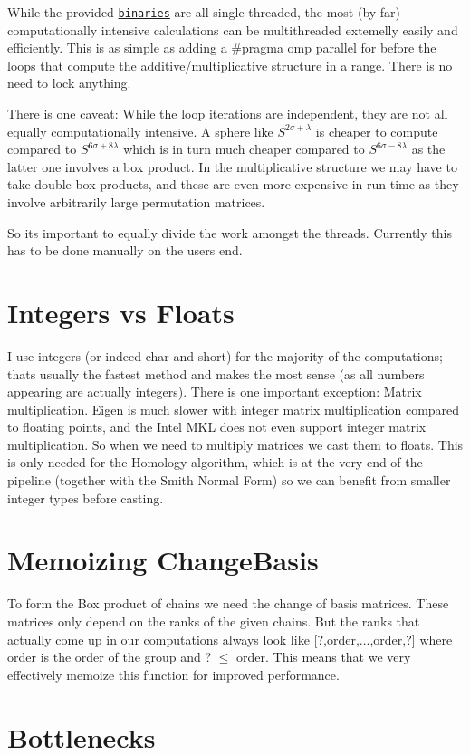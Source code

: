 \begin{DoxyItemize}
\item While the provided \href{https://github.com/NickG-Math/Mackey/tree/master/bin}{\tt binaries} are all single-\/threaded, the most (by far) computationally intensive calculations can be multithreaded extemelly easily and efficiently. This is as simple as adding a {\ttfamily \#pragma omp parallel for} before the loops that compute the additive/multiplicative structure in a range. There is no need to lock anything.
\item There is one caveat\+: While the loop iterations are independent, they are not all equally computationally intensive. A sphere like $S^{2\sigma+\lambda}$ is cheaper to compute compared to $S^{6\sigma+8\lambda}$ which is in turn much cheaper compared to $S^{6\sigma-8\lambda}$ as the latter one involves a box product. In the multiplicative structure we may have to take double box products, and these are even more expensive in run-\/time as they involve arbitrarily large permutation matrices.
\item So it\textquotesingle{}s important to equally divide the work amongst the threads. Currently this has to be done manually on the user\textquotesingle{}s end.
\end{DoxyItemize}\hypertarget{perf_intvsfloat}{}\section{Integers vs Floats}\label{perf_intvsfloat}
I use integers (or indeed {\ttfamily char} and {\ttfamily short}) for the majority of the computations; that\textquotesingle{}s usually the fastest method and makes the most sense (as all numbers appearing are actually integers). There is one important exception\+: Matrix multiplication. \hyperlink{namespaceEigen}{Eigen} is much slower with integer matrix multiplication compared to floating points, and the Intel M\+KL does not even support integer matrix multiplication. So when we need to multiply matrices we cast them to floats. This is only needed for the Homology algorithm, which is at the very end of the pipeline (together with the Smith Normal Form) so we can benefit from smaller integer types before casting.\hypertarget{perf_memo}{}\section{Memoizing Change\+Basis}\label{perf_memo}
To form the Box product of chains we need the change of basis matrices. These matrices only depend on the ranks of the given chains. But the ranks that actually come up in our computations always look like \mbox{[}?,order,...,order,?\mbox{]} where order is the order of the group and ? $\le$ order. This means that we very effectively memoize this function for improved performance.\hypertarget{perf_bottle}{}\section{Bottlenecks}\label{perf_bottle}


